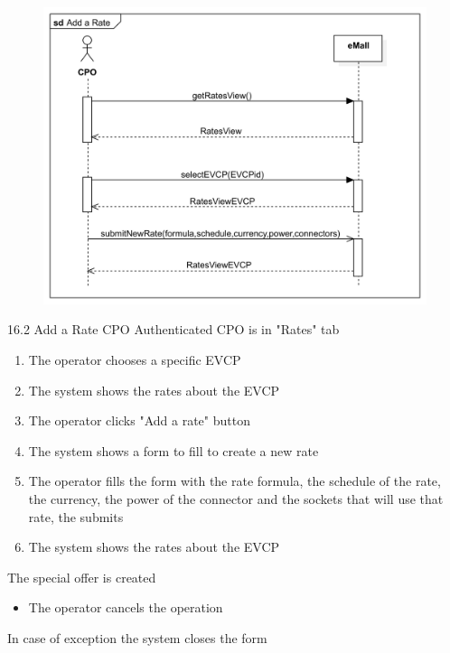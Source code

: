 \usecase
{
    \begin{figure}[H]
        \centering
        \includegraphics[scale=0.9]{src/sequence_diagram/addRate.png}
    \end{figure}
}
{16.2}
{Add a Rate} %
{CPO} %
{Authenticated CPO is in "Rates" tab} %
{ %
    \begin{enumerate}
        \item The operator chooses a specific EVCP
        \item The system shows the rates about the EVCP
        \item The operator clicks "Add a rate" button
        \item The system shows a form to fill to create a new rate
        \item The operator fills the form with the rate formula, the schedule of the rate, the currency, the power of the connector and the sockets that will use that rate, the submits
        \item The system shows the rates about the EVCP
    \end{enumerate}
}
{The special offer is created} %
{ %
    \begin{itemize}
        \item The operator cancels the operation
    \end{itemize}
}
{ %
    In case of exception the system closes the form
}


